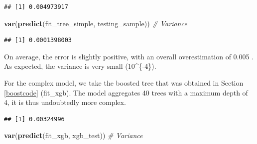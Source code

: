\documentclass[]{krantz}
\makeatletter
\newenvironment{Shaded}{\begin{snugshade}}{\end{snugshade}}
\newcommand{\CommentTok}[1]{\textcolor[rgb]{0.37,0.37,0.37}{\textit{#1}}}
\newcommand{\KeywordTok}[1]{\textcolor[rgb]{0.27,0.27,0.27}{\textbf{#1}}}
\newcommand{\NormalTok}[1]{#1}
\newcommand{\OperatorTok}[1]{\textcolor[rgb]{0.43,0.43,0.43}{\textbf{#1}}}
\newcommand{\StringTok}[1]{\textcolor[rgb]{0.5,0.5,0.5}{#1}}
\newenvironment{kframe}{%
\medskip{}
\setlength{\fboxsep}{.8em}
 \def\at@end@of@kframe{}%
 \ifinner\ifhmode%
  \def\at@end@of@kframe{\end{minipage}}%
  \begin{minipage}{\columnwidth}%
 \fi\fi%
 \def\FrameCommand##1{\hskip\@totalleftmargin \hskip-\fboxsep
 \colorbox{shadecolor}{##1}\hskip-\fboxsep
     \hskip-\linewidth \hskip-\@totalleftmargin \hskip\columnwidth}%
 \MakeFramed {\advance\hsize-\width
   \@totalleftmargin\z@ \linewidth\hsize
   \@setminipage}}%
 {\par\unskip\endMakeFramed%
 \at@end@of@kframe}
\renewenvironment{Shaded}{\begin{kframe}}{\end{kframe}}
\theoremstyle{definition}
\theoremstyle{definition}
\theoremstyle{definition}
\theoremstyle{remark}
\makeatother
\begin{document}
\begin{Shaded}
\end{Shaded}

\begin{verbatim}
## [1] 0.004973917
\end{verbatim}

\begin{Shaded}
\begin{Highlighting}[]
\KeywordTok{var}\NormalTok{(}\KeywordTok{predict}\NormalTok{(fit_tree_simple, testing_sample))                           }\CommentTok{# Variance}
\end{Highlighting}
\end{Shaded}

\begin{verbatim}
## [1] 0.0001398003
\end{verbatim}

\normalsize

On average, the error is slightly positive, with an overall
overestimation of 0.005 . As expected, the variance is very small
(10\^{}\{-4\}).

For the complex model, we take the boosted tree that was obtained in
Section \ref{boostcode} (fit\_xgb). The model aggregates 40 trees with a
maximum depth of 4, it is thus undoubtedly more complex.

\footnotesize

\begin{Shaded}
\end{Shaded}

\begin{verbatim}
## [1] 0.00324996
\end{verbatim}

\begin{Shaded}
\begin{Highlighting}[]
\KeywordTok{var}\NormalTok{(}\KeywordTok{predict}\NormalTok{(fit_xgb, xgb_test))                           }\CommentTok{# Variance}
\end{Highlighting}
\end{Shaded}
\end{document}
